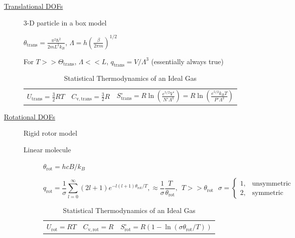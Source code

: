 \documentclass[11pt]{article}
\begin{document}
\begin{table}
\begin{center}
    \caption{\large{Statistical Thermodynamics of an Ideal Gas}}
   \begin{description}
    \item[\underline{Translational DOFs}] {3-D particle in a box model}

$\displaystyle \theta_\mathrm{trans}= \frac{\pi^2\hbar^2}{2 m
  L^2 k_B}$,
$\displaystyle \Lambda=h\left( \frac{\beta}{2\pi m}\right )^{1/2}$

For $ T >> \Theta_\mathrm{trans}$, $\Lambda << L$, $\displaystyle
q_\mathrm{trans}=V/\Lambda^3$ (essentially always true)

\begin{tabular}{ccc}
$\displaystyle U_\mathrm{trans}=\frac{3}{2}RT$ & $\displaystyle C_\mathrm{v,trans} =
\frac{3}{2}R $ & $\displaystyle S^\circ_\mathrm{trans}=R \ln \left (
  \frac{e^{5/2}V^\circ}{N^\circ \Lambda^3}\right ) = R \ln \left (
  \frac{e^{5/2}k_BT}{P^\circ \Lambda^3}\right ) $ \\
\end{tabular}

  \item[\underline{Rotational DOFs}] {Rigid rotor model}
\begin{description}
\item[Linear molecule]{}
$\theta_\mathrm{rot} =hcB/k_B$

\begin{equation*}
q_\mathrm{rot}=\frac{1}{\sigma}\sum_{l=0}^\infty (2l+1)e^{-l(l+1)\theta_\mathrm{rot}/T},
\approx \frac{1}{\sigma}\frac{T}{\theta_\mathrm{rot}},\ \ T>>\theta_\mathrm{rot}\ \ \ \sigma = \left \{
        \begin{array}{rl}
          1, & \text{unsymmetric} \\
          2, & \text{symmetric}
        \end{array} \right .
\end{equation*}
\begin{tabular}{ccc}
$\displaystyle U_\mathrm{rot}=RT$ & $\displaystyle C_\mathrm{v,rot} =
R $ & $\displaystyle S^\circ_\mathrm{rot}=R (1-\ln(\sigma\theta_\mathrm{rot}/T)) $ \\
\end{tabular}



\end{description}
\end{description}
\end{center}
\end{table}
\end{document}
